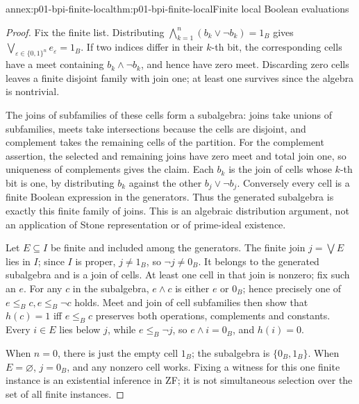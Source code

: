 \begin{annexitem}{annex:p01-bpi-finite-local}{thm:p01-bpi-finite-local}{Finite local Boolean evaluations}
\begin{proof}
Fix the finite list. Distributing
\(\bigwedge_{k=1}^{n}(b_k\vee\neg b_k)=1_B\) gives
\(\bigvee_{\varepsilon\in\{0,1\}^{n}}e_\varepsilon=1_B\).
If two indices differ in their \(k\)-th bit, the corresponding cells
have a meet containing \(b_k\wedge\neg b_k\), and hence have zero
meet. Discarding zero cells leaves a finite disjoint family with join one;
at least one survives since the algebra is nontrivial.

The joins of subfamilies of these cells form a subalgebra: joins take
unions of subfamilies, meets take intersections because the cells are
disjoint, and complement takes the remaining cells of the partition.
For the complement assertion, the selected and remaining joins have zero
meet and total join one, so uniqueness of complements gives the claim.
Each \(b_k\) is the join of cells whose \(k\)-th bit is one, by
distributing \(b_k\) against the other \(b_j\vee\neg b_j\).
Conversely every cell is a finite Boolean expression in the generators.
Thus the generated subalgebra is exactly this finite family of joins.
This is an algebraic distribution argument, not an application of Stone
representation or of prime-ideal existence.

Let \(E\subseteq I\) be finite and included among the generators.
The finite join \(j=\bigvee E\) lies in \(I\); since \(I\) is proper,
\(j\ne1_B\), so \(\neg j\ne0_B\). It belongs to the generated
subalgebra and is a join of cells. At least one cell in that join is
nonzero; fix such an \(e\). For any \(c\) in the subalgebra,
\(e\wedge c\) is either \(e\) or \(0_B\); hence precisely one of
\(e\leq_B c,e\leq_B\neg c\) holds. Meet and join of cell subfamilies
then show that \(h(c)=1\) iff \(e\leq_B c\) preserves both
operations, complements and constants. Every \(i\in E\) lies below
\(j\), while \(e\leq_B\neg j\), so \(e\wedge i=0_B\), and
\(h(i)=0\).

When \(n=0\), there is just the empty cell \(1_B\); the subalgebra
is \(\{0_B,1_B\}\). When \(E=\varnothing\), \(j=0_B\), and any
nonzero cell works. Fixing a witness for this one finite instance is an
existential inference in ZF; it is not simultaneous selection over the set
of all finite instances.
\end{proof}
\end{annexitem}

